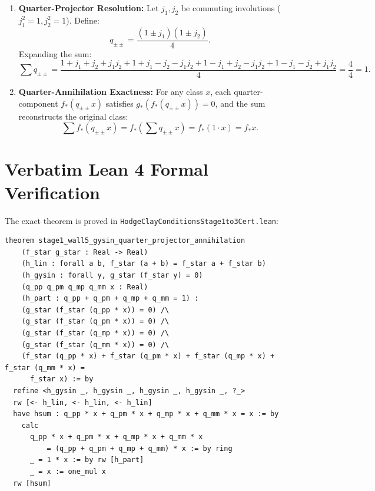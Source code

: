 \documentclass[11pt,a4paper]{article}
\theoremstyle{definition}
\begin{document}
\begin{enumerate}
  \item \textbf{Quarter-Projector Resolution:}
  Let $j_1, j_2$ be commuting involutions ($j_1^2 = 1, j_2^2 = 1$). Define:
  \begin{equation}
  q_{\pm\pm} = \frac{(1 \pm j_1)(1 \pm j_2)}{4}.
  \end{equation}
  Expanding the sum:
  \begin{equation}
  \sum q_{\pm\pm} = \frac{1 + j_1 + j_2 + j_1 j_2 + 1 + j_1 - j_2 - j_1 j_2 + 1 - j_1 + j_2 - j_1 j_2 + 1 - j_1 - j_2 + j_1 j_2}{4} = \frac{4}{4} = 1.
  \end{equation}
  \item \textbf{Quarter-Annihilation Exactness:}
  For any class $x$, each quarter-component $f_*(q_{\pm\pm} x)$ satisfies $g_*(f_*(q_{\pm\pm} x)) = 0$, and the sum reconstructs the original class:
  \begin{equation}
  \sum f_*(q_{\pm\pm} x) = f_*\left(\sum q_{\pm\pm} x\right) = f_*(1 \cdot x) = f_* x.
  \end{equation}
\end{enumerate}

\section{Verbatim Lean 4 Formal Verification}

The exact theorem is proved in \texttt{HodgeClayConditionsStage1to3Cert.lean}:

\begin{lstlisting}[language=Lean4]
theorem stage1_wall5_gysin_quarter_projector_annihilation
    (f_star g_star : Real -> Real)
    (h_lin : forall a b, f_star (a + b) = f_star a + f_star b)
    (h_gysin : forall y, g_star (f_star y) = 0)
    (q_pp q_pm q_mp q_mm x : Real)
    (h_part : q_pp + q_pm + q_mp + q_mm = 1) :
    (g_star (f_star (q_pp * x)) = 0) /\
    (g_star (f_star (q_pm * x)) = 0) /\
    (g_star (f_star (q_mp * x)) = 0) /\
    (g_star (f_star (q_mm * x)) = 0) /\
    (f_star (q_pp * x) + f_star (q_pm * x) + f_star (q_mp * x) + f_star (q_mm * x) =
      f_star x) := by
  refine <h_gysin _, h_gysin _, h_gysin _, h_gysin _, ?_>
  rw [<- h_lin, <- h_lin, <- h_lin]
  have hsum : q_pp * x + q_pm * x + q_mp * x + q_mm * x = x := by
    calc
      q_pp * x + q_pm * x + q_mp * x + q_mm * x
          = (q_pp + q_pm + q_mp + q_mm) * x := by ring
      _ = 1 * x := by rw [h_part]
      _ = x := one_mul x
  rw [hsum]
\end{lstlisting}
\end{document}
